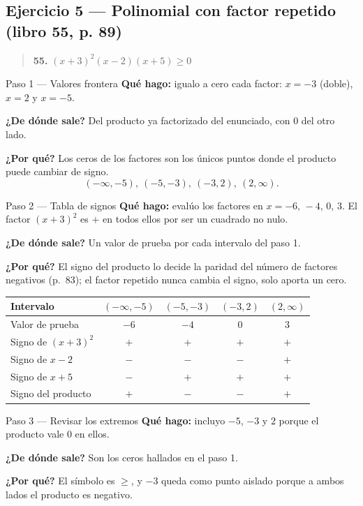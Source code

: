 \documentclass[11pt]{article}
\begin{document}
\subsection*{Ejercicio 5 --- Polinomial con factor repetido (libro 55, p. 89)}

\begin{quote}
\textbf{55.} $(x+3)^2(x-2)(x+5)\ge 0$
\end{quote}

\begin{paso}{Paso 1 --- Valores frontera}
\textbf{Qué hago:} igualo a cero cada factor: $x=-3$ (doble), $x=2$ y $x=-5$.

\textbf{¿De dónde sale?} Del producto ya factorizado del enunciado, con $0$ del otro lado.

\textbf{¿Por qué?} Los ceros de los factores son los únicos puntos donde el producto puede cambiar de signo.
\[
(-\infty,-5),\ (-5,-3),\ (-3,2),\ (2,\infty).
\]
\end{paso}

\begin{paso}{Paso 2 --- Tabla de signos}
\textbf{Qué hago:} evalúo los factores en $x=-6,\,-4,\,0,\,3$. El factor $(x+3)^2$ es $+$ en todos ellos por ser un cuadrado no nulo.

\textbf{¿De dónde sale?} Un valor de prueba por cada intervalo del paso 1.

\textbf{¿Por qué?} El signo del producto lo decide la paridad del número de factores negativos (p.~83); el factor repetido nunca cambia el signo, solo aporta un cero.

\begin{center}
\begin{tabular}{|l|c|c|c|c|}
\hline
Intervalo & $(-\infty,-5)$ & $(-5,-3)$ & $(-3,2)$ & $(2,\infty)$ \\
\hline
Valor de prueba & $-6$ & $-4$ & $0$ & $3$ \\
Signo de $(x+3)^2$ & $+$ & $+$ & $+$ & $+$ \\
Signo de $x-2$ & $-$ & $-$ & $-$ & $+$ \\
Signo de $x+5$ & $-$ & $+$ & $+$ & $+$ \\
\hline
Signo del producto & $+$ & $-$ & $-$ & $+$ \\
\hline
\end{tabular}
\end{center}
\end{paso}

\begin{paso}{Paso 3 --- Revisar los extremos}
\textbf{Qué hago:} incluyo $-5$, $-3$ y $2$ porque el producto vale $0$ en ellos.

\textbf{¿De dónde sale?} Son los ceros hallados en el paso 1.

\textbf{¿Por qué?} El símbolo es $\ge$, y $-3$ queda como punto aislado porque a ambos lados el producto es negativo.
\end{paso}
\end{document}
